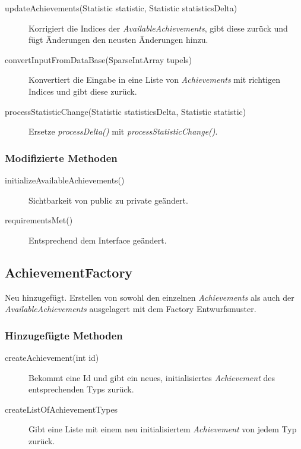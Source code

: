 \begin{description}
	\item[updateAchievements(Statistic statistic, Statistic statisticsDelta)]
	Korrigiert die Indices der \emph{AvailableAchievements}, gibt diese zurück und fügt Änderungen den neusten Änderungen hinzu.	
	
	\item[convertInputFromDataBase(SparseIntArray tupels)]
	Konvertiert die Eingabe in eine Liste von \emph{Achievements} mit richtigen Indices und gibt diese zurück.

	\item[processStatisticChange(Statistic statisticsDelta, Statistic statistic)]
	Ersetze \emph{processDelta()} mit \emph{processStatisticChange()}.
	
\end{description}



\subsubsection{Modifizierte Methoden}

\begin{description}
	\item[initializeAvailableAchievements()]
	Sichtbarkeit von public zu private geändert.
	
	\item[requirementsMet()]
	Entsprechend dem Interface geändert.	
\end{description}



\subsection{AchievementFactory}
Neu hinzugefügt.
Erstellen von sowohl den einzelnen \emph{Achievements} als auch der \emph{AvailableAchievements} ausgelagert mit dem Factory Entwurfsmuster.

\subsubsection{Hinzugefügte Methoden}

\begin{description}
	\item[createAchievement(int id)]
	Bekommt eine Id und gibt ein neues, initialisiertes \emph{Achievement} des entsprechenden Typs zurück.

	\item[createListOfAchievementTypes]
	Gibt eine Liste mit einem neu initialisiertem \emph{Achievement} von jedem Typ zurück.

\end{description}


